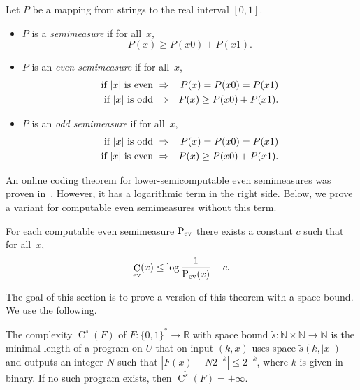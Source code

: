 \documentclass[runningheads]{llncs}
\DeclareMathOperator{\C}{C} \newcommand{\Cev}{\C_\textnormal{ev}} \newcommand{\Codd}{\C_\textnormal{odd}}
\DeclareMathOperator{\Pev}{P_{\textnormal{ev}}} \DeclareMathOperator{\Podd}{P_{\textnormal{odd}}} \DeclareMathOperator{\Pc}{PC}
\begin{document}
\begin{definition}
  Let $P$ be a mapping from strings to the real interval $[0,1]$. 
  \begin{itemize}
    \item 
      $P$ is a {\em semimeasure} if for all~$x$, 
      \[
	P(x) \ge P(x0) + P(x1).
      \]
    \item 
      $P$ is an {\em even semimeasure} if for all~$x$, 
      \begin{eqnarray*}
	\textnormal{if $|x|$ is even } & \Rightarrow & P(x) = P(x0) = P(x1) \\
	  \textnormal{if $|x|$ is odd }  & \Rightarrow & P(x) \ge P(x0) + P(x1). 
      \end{eqnarray*}
    \item 
      $P$ is an {\em odd semimeasure} if for all~$x$, 
      \begin{eqnarray*}
	\textnormal{if $|x|$ is odd } & \Rightarrow & P(x) = P(x0) = P(x1) \\
	  \textnormal{if $|x|$ is even }  & \Rightarrow & P(x) \ge P(x0) + P(x1). 
      \end{eqnarray*}
  \end{itemize}
\end{definition}



\noindent
An online coding theorem for lower-semicomputable even semimeasures was proven in~\cite{onlineComplexity}. 
However, it has a logarithmic term in the right side. 
Below, we prove a variant for computable even semimeasures without this term. 

\begin{proposition}\label{prop:onlineCoding}
 For each computable even semimeasure $\Pev$ there exists a constant $c$ such that for all~$x$, 
  \[
    \Cev(x) \le \log \frac 1 {\Pev(x)} + c. 
  \]
\end{proposition}

\noindent
The goal of this section is to prove a version of this theorem with a space-bound. 
We use the following. 

\begin{definition}
  The complexity $\C^{\tilde s}(F)$ of $F: \{0,1\}^* \rightarrow \mathbb R$ with space bound $\tilde s: \mathbb N \times \mathbb N \rightarrow \mathbb N$ is the minimal length of a program on $U$ that on input $(k,x)$ uses space $\tilde s(k,|x|)$ and outputs an integer $N$ such that $|F(x)-N2^{-k}| \le 2^{-k}$, where $k$ is given in binary.  
  If no such program exists, then $\C^{\tilde s}(F) = +\infty$. 
\end{definition}
\end{document}
